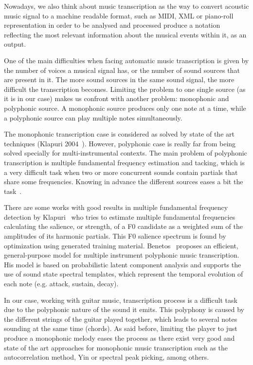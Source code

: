 Nowadays, we also think about music transcription as the way to convert acoustic music signal to a machine readable format, such as MIDI, XML or piano-roll representation in order to be analysed and processed produce a notation reflecting the most relevant information about the musical events within it, as an output. 	

One of the main difficulties when facing automatic music transcription is given by the number of voices a musical signal has, or the number of sound sources that are present in it. The more sound sources in the same sound signal, the more difficult the transcription becomes. Limiting the problem to one single source (as it is in our case) makes us confront with another problem: monophonic and polyphonic source. A monophonic source produces only one note at a time, while a polyphonic source can play multiple notes simultaneously.

The monophonic transcription case is considered as solved by state of the art techniques (Klapuri 2004~\cite{Klapuri2004}). However, polyphonic case is really far from being solved specially for multi-instrumental contexts. The main problem of polyphonic transcription is multiple fundamental frequency estimation and tacking, which is a very difficult task when two or more concurrent sounds contain partials that share some frequencies. Knowing in advance the different sources eases a bit the task~\cite{argenti2011}. 

There are some works with good results in multiple fundamental frequency detection by Klapuri~\cite{Klapuri2006} who tries to estimate multiple fundamental frequencies calculating the salience, or strength, of a F0 candidate as a weighted sum of the amplitudes of its harmonic partials. This F0 salience spectrum is found by optimization using generated training material. Benetos~\cite{benetos2015efficient} proposes an efficient, general-purpose model for multiple instrument polyphonic music transcription. His model is based on probabilistic latent component analysis and supports the use of sound state spectral templates, which represent the temporal evolution of each note (e.g. attack, sustain, decay).

In our case, working with guitar music, transcription process is a difficult task due to the polyphonic nature of the sound it emits. This polyphony is caused by the different strings of the guitar played together, which leads to several notes sounding at the same time (chords).  As said before, limiting the player to just produce a monophonic melody eases the process as there exist very good and state of the art approaches for monophonic music transcription such as the autocorrelation method, Yin or spectral peak picking, among others.

